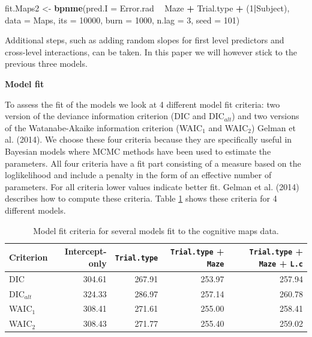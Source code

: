 \documentclass[11pt,]{article}
\newenvironment{Shaded}{\begin{snugshade}}{\end{snugshade}}
\newcommand{\DataTypeTok}[1]{\textcolor[rgb]{0.13,0.29,0.53}{#1}}
\newcommand{\DecValTok}[1]{\textcolor[rgb]{0.00,0.00,0.81}{#1}}
\newcommand{\KeywordTok}[1]{\textcolor[rgb]{0.13,0.29,0.53}{\textbf{#1}}}
\newcommand{\NormalTok}[1]{#1}
\newcommand{\OperatorTok}[1]{\textcolor[rgb]{0.81,0.36,0.00}{\textbf{#1}}}
\newcommand{\StringTok}[1]{\textcolor[rgb]{0.31,0.60,0.02}{#1}}
\begin{document}
\begin{Shaded}
\begin{Highlighting}[]
\NormalTok{fit.Maps2 <-}\StringTok{ }\KeywordTok{bpnme}\NormalTok{(}\DataTypeTok{pred.I =}\NormalTok{ Error.rad }\OperatorTok{~}\StringTok{ }\NormalTok{Maze }\OperatorTok{+}\StringTok{ }\NormalTok{Trial.type }\OperatorTok{+}\StringTok{ }\NormalTok{(}\DecValTok{1}\OperatorTok{|}\NormalTok{Subject),}
                  \DataTypeTok{data =}\NormalTok{ Maps,}
                  \DataTypeTok{its =} \DecValTok{10000}\NormalTok{, }\DataTypeTok{burn =} \DecValTok{1000}\NormalTok{, }\DataTypeTok{n.lag =} \DecValTok{3}\NormalTok{, }\DataTypeTok{seed =} \DecValTok{101}\NormalTok{)}
\end{Highlighting}
\end{Shaded}

Additional steps, such as adding random slopes for first level
predictors and cross-level interactions, can be taken. In this paper we
will however stick to the previous three models.

\textbf{Model fit}

To assess the fit of the models we look at 4 different model fit
criteria: two version of the deviance information criterion (DIC and
DIC\(_{alt}\)) and two versions of the Watanabe-Akaike information
criterion (WAIC\(_1\) and WAIC\(_2\)) Gelman et al. (2014). We choose
these four criteria because they are specifically useful in Bayesian
models where MCMC methods have been used to estimate the parameters. All
four criteria have a fit part consisting of a measure based on the
loglikelihood and include a penalty in the form of an effective number
of parameters. For all criteria lower values indicate better fit. Gelman
et al. (2014) describes how to compute these criteria. Table
\ref{TableModelFitMaps} shows these criteria for 4 different models.

\begin{table}
\centering
\caption{Model fit criteria for several models fit to the cognitive maps data.} 
\begin{tabular}{lrrrr}
  \hline\noalign{\smallskip}
 Criterion & Intercept-only & \verb|Trial.type| & \verb|Trial.type| + \verb|Maze| & \verb|Trial.type| + \verb|Maze| + \verb|L.c|  \\ \hline\noalign{\smallskip}
DIC             & 304.61 & 267.91 & 253.97 & 257.94 \\
DIC$_{alt}$     & 324.33 & 286.97 & 257.14 & 260.78 \\
WAIC$_1$        & 308.41 & 271.61 & 255.00 & 258.41 \\
WAIC$_2$        & 308.43 & 271.77 & 255.40 & 259.02 \\
   \hline
\end{tabular}
\label{TableModelFitMaps}
\end{table}
\end{document}
